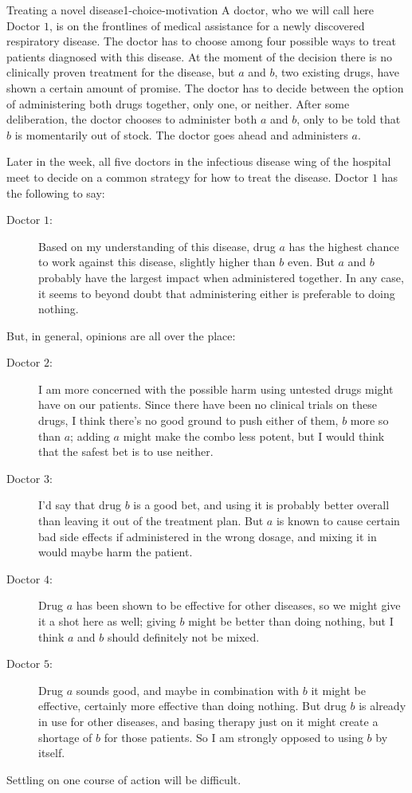 \begin{xmpl}{Treating a novel disease}{1-choice-motivation}
	A doctor, who we will call here Doctor $1$,
	is on the frontlines of medical assistance 
	for a newly discovered respiratory disease.
	The doctor has to choose among four possible 
	ways to treat patients diagnosed with this disease. 
	At the moment of the decision there is no clinically 
	proven treatment for the disease, but $a$ and $b$,
	two existing drugs, have shown a certain amount of promise.
	The doctor has to decide between the option of administering 
	both drugs together, only one, or neither. 
	After some deliberation, the doctor chooses to administer
	both $a$ and $b$, only to be told that $b$ is momentarily out of stock.
	The doctor goes ahead and administers $a$.
	
	Later in the week, all five doctors in the infectious disease
	wing of the hospital meet to decide on a common strategy for how to 
	treat the disease.
	Doctor $1$ has the following to say:

	\begin{description}
		\item[Doctor $1$:] Based on my understanding of this disease, 
			drug $a$ has the highest chance to work against this disease,
			slightly higher than $b$ even. 
			But $a$ and $b$ probably have the largest impact when administered together. 
			In any case, it seems to beyond doubt that administering either 
			is preferable to doing nothing.
	\end{description}
	But, in general, opinions are all over the place:
	\begin{description}
		\item[Doctor $2$:] I am more concerned with the possible harm using untested drugs
			might have on our patients. 
			Since there have been no clinical trials on these drugs, 
			I think there's no good ground to push either of them, 
			$b$ more so than $a$; adding $a$ might make the combo less potent, 
			but I would think that the safest bet is to use neither.
		\item[Doctor $3$:] I'd say that drug $b$ is a good bet, 
			and using it is probably better overall than leaving it out
			of the treatment plan.
			But $a$ is known to cause certain bad side effects
			if administered in the wrong dosage, 
			and mixing it in would maybe harm the patient.
		\item[Doctor $4$:]	Drug $a$ has been shown to be effective for other diseases,
			so we might give it a shot here as well; 
			giving $b$ might be better than doing nothing,
			but I think $a$ and $b$ should definitely not be mixed. 	
		\item[Doctor $5$:] Drug $a$ sounds good, 
			and maybe in combination with $b$ it might be 
			effective, 
			certainly more effective than doing nothing. 
			But drug $b$ is already in use for other diseases,
			and basing therapy just on it might create a shortage
			of $b$ for those patients.
			So I am strongly opposed to using $b$ by itself.
	\end{description}
	Settling on one course of action will be difficult.
\end{xmpl}

